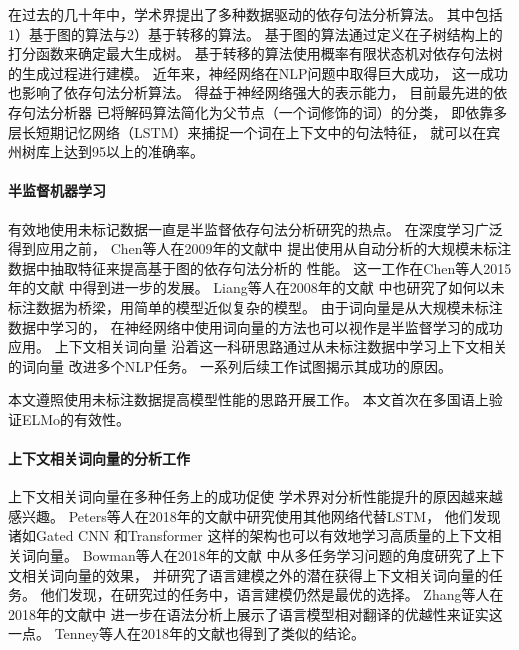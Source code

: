 在过去的几十年中，学术界提出了多种数据驱动的依存句法分析算法。
其中包括1）基于图的算法\cite{mcdonald2006online}与2）基于转移的算法\cite{nivre2008algorithms,dyer-EtAl:2015:ACL-IJCNLP,zhang-nivre:2011:ACL-HLT2011}。
基于图的算法通过定义在子树结构上的打分函数来确定最大生成树。
基于转移的算法使用概率有限状态机对依存句法树的生成过程进行建模。
近年来，神经网络在NLP问题中取得巨大成功，
这一成功也影响了依存句法分析算法。
得益于神经网络强大的表示能力，
目前最先进的依存句法分析器\cite{DBLP:journals/corr/DozatM16,dozat-qi-manning:2017:K17-3}
已将解码算法简化为父节点（一个词修饰的词）的分类，
即依靠多层长短期记忆网络（LSTM）来捕捉一个词在上下文中的句法特征，
就可以在宾州树库上达到95以上的准确率。

\paragraph{半监督机器学习}
有效地使用未标记数据一直是半监督依存句法分析研究的热点。
在深度学习广泛得到应用之前，
Chen等人在2009年的文献中
提出使用从自动分析的大规模未标注数据中抽取特征来提高基于图的依存句法分析的
性能。
这一工作在Chen等人2015年的文献
中得到进一步的发展。
Liang等人在2008年的文献
中也研究了如何以未标注数据为桥梁，用简单的模型近似复杂的模型。
由于词向量是从大规模未标注数据中学习的，
在神经网络中使用词向量的方法也可以视作是半监督学习的成功应用。
上下文相关词向量\cite{peters-EtAl:2018:N18-1,DBLP:journals/corr/abs-1810-04805}
沿着这一科研思路通过从未标注数据中学习上下文相关的词向量
改进多个NLP任务。 
一系列后续工作\cite{P18-1031,joshi-peters-hopkins:2018:Long,peters-EtAl:2018:EMNLP}试图揭示其成功的原因。

本文遵照使用未标注数据提高模型性能的思路开展工作。
本文首次在多国语上验证ELMo的有效性。

\paragraph{上下文相关词向量的分析工作}
上下文相关词向量在多种任务上的成功促使
学术界对分析性能提升的原因越来越感兴趣。 
Peters等人在2018年的文献中研究使用其他网络代替LSTM，
他们发现诸如Gated CNN \cite{pmlr-v70-dauphin17a}
和Transformer \cite{NIPS2017_7181}
这样的架构也可以有效地学习高质量的上下文相关词向量。
Bowman等人在2018年的文献
中从多任务学习问题的角度研究了上下文相关词向量的效果，
并研究了语言建模之外的潜在获得上下文相关词向量的任务。
他们发现，在研究过的任务中，语言建模仍然是最优的选择。 
Zhang等人在2018年的文献中
进一步在语法分析上展示了语言模型相对翻译的优越性来证实这一点。 
Tenney等人在2018年的文献也得到了类似的结论。

